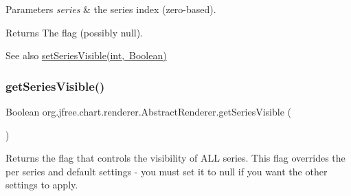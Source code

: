 \begin{DoxyParams}{Parameters}
{\em series} & the series index (zero-\/based).\\
\hline
\end{DoxyParams}
\begin{DoxyReturn}{Returns}
The flag (possibly {\ttfamily null}).
\end{DoxyReturn}
\begin{DoxySeeAlso}{See also}
\mbox{\hyperlink{classorg_1_1jfree_1_1chart_1_1renderer_1_1_abstract_renderer_a4311b798698e141c2fb2deb6a412283f}{set\+Series\+Visible(int, Boolean)}} 
\end{DoxySeeAlso}
\mbox{\label{classorg_1_1jfree_1_1chart_1_1renderer_1_1_abstract_renderer_a2779761677dd1fc3387fde96068b0b85}} 
\subsubsection{\texorpdfstring{get\+Series\+Visible()}{getSeriesVisible()}\hspace{0.1cm}{\footnotesize\ttfamily [2/2]}}
{\footnotesize\ttfamily Boolean org.\+jfree.\+chart.\+renderer.\+Abstract\+Renderer.\+get\+Series\+Visible (\begin{DoxyParamCaption}{ }\end{DoxyParamCaption})}

Returns the flag that controls the visibility of A\+LL series. This flag overrides the per series and default settings -\/ you must set it to {\ttfamily null} if you want the other settings to apply.

